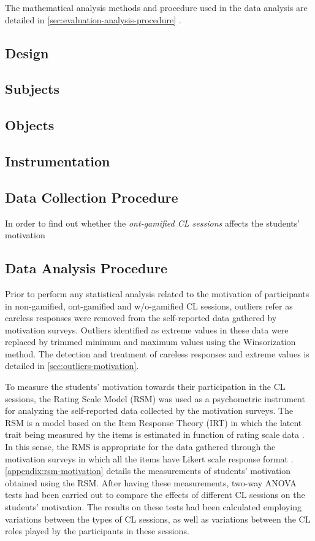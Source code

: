 The mathematical analysis methods and procedure used in the data analysis are detailed in \autoref{sec:evaluation-analysis-procedure} .

\subsection{Design}

\subsection{Subjects}

\subsection{Objects}

\subsection{Instrumentation}

\subsection{Data Collection Procedure}

In order to find out whether the \emph{ont-gamified CL sessions} affects the students' motivation 


\subsection{Data Analysis Procedure}
\label{sec:evaluation-analysis-procedure}

Prior to perform any statistical analysis related to the motivation of participants in non-gamified, ont-gamified and w/o-gamified CL sessions, outliers refer as careless responses were removed from the self-reported data gathered by motivation surveys. Outliers identified as extreme values in these data were replaced by trimmed minimum and maximum values using the Winsorization method. The detection and treatment of careless responses and extreme values is detailed in \autoref{sec:outliers-motivation}.

To measure the students' motivation towards their participation in the CL sessions, the Rating Scale Model (RSM) was used as a psychometric instrument for analyzing the self-reported data collected by the motivation surveys. The RSM is a model based on the Item Response Theory (IRT) in which the latent trait being measured by the items is estimated in function of rating scale data \cite{George2005}. In this sense, the RMS is appropriate for the data gathered through the motivation surveys in which all the items have Likert scale response format \cite{van2013handbook}. \autoref{appendix:rsm-motivation} details the measurements of students' motivation obtained using the RSM. After having these measurements, two-way ANOVA tests had been carried out to compare the effects of different CL sessions on the students' motivation. The results on these tests had been calculated employing variations between the types of CL sessions, as well as variations between the CL roles played by the participants in these sessions.

